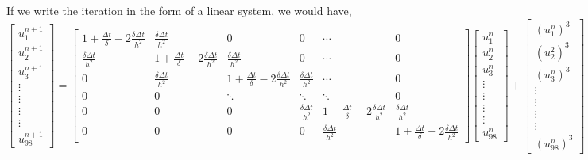 \documentclass{article}
\begin{document}
\vspace{1em}
\noindent
If we write the iteration in the form of a linear system, we would have,
\[
\renewcommand{\arraystretch}{1.5}
\begin{bmatrix}
  u_1^{n+1} \\
  u_2^{n+1} \\
  u_3^{n+1} \\
  \vdots \\
  \vdots \\
  \vdots \\
  \vdots \\
  u_{98}^{n+1}
\end{bmatrix}
=
\begin{bmatrix}
    1 + \frac{\Delta t}{\delta} - 2\frac{\delta \Delta t}{h^2} & \frac{\delta \Delta t}{h^2} & 0 & 0 & \cdots & 0 \\
    \frac{\delta \Delta t}{h^2} & 1 + \frac{\Delta t}{\delta} - 2\frac{\delta \Delta t}{h^2} & \frac{\delta \Delta t}{h^2} & 0 & \cdots & 0 \\
    0 & \frac{\delta \Delta t}{h^2} & 1 + \frac{\Delta t}{\delta} - 2\frac{\delta \Delta t}{h^2} & \frac{\delta \Delta t}{h^2} & \cdots & 0 \\
    0 & 0 & \ddots & \ddots & \ddots & 0 \\
    0 & 0 & 0 & \frac{\delta \Delta t}{h^2} & 1 + \frac{\Delta t}{\delta} - 2\frac{\delta \Delta t}{h^2} & \frac{\delta \Delta t}{h^2} \\
    0 & 0 & 0 & 0 & \frac{\delta \Delta t}{h^2} & 1 + \frac{\Delta t}{\delta} - 2\frac{\delta \Delta t}{h^2}
\end{bmatrix}
\begin{bmatrix}
u_1^{n} \\
  u_2^{n} \\
  u_3^{n} \\
  \vdots \\
  \vdots \\
  \vdots \\
  \vdots \\
  u_{98}^{n}
\end{bmatrix}
+
\begin{bmatrix}
  (u_1^n)^3 \\
  (u_2^2)^3 \\
  (u_3^n)^3 \\
  \vdots\\
  \vdots\\
  \vdots\\
  \vdots\\
  (u_{98}^n)^3
\end{bmatrix}
\]
\end{document}
